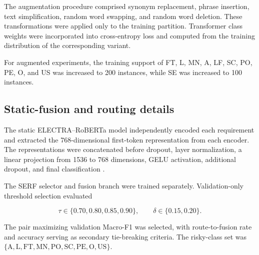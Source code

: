 \documentclass[runningheads]{llncs}
\begin{document}
The augmentation procedure comprised synonym replacement, phrase insertion, text simplification, random word swapping, and random word deletion. These transformations were applied only to the training partition. Transformer class weights were incorporated into cross-entropy loss and computed from the training distribution of the corresponding variant.

For augmented experiments, the training support of FT, L, MN, A, LF, SC, PO, PE, O, and US was increased to 200 instances, while SE was increased to 100 instances.

\subsection*{Static-fusion and routing details}

The static ELECTRA--RoBERTa model independently encoded each requirement and extracted the 768-dimensional first-token representation from each encoder. The representations were concatenated before dropout, layer normalization, a linear projection from 1536 to 768 dimensions, GELU activation, additional dropout, and final classification \cite{said_functional_nonfunctional}.

The SERF selector and fusion branch were trained separately. Validation-only threshold selection evaluated

\[ \tau\in\{0.70,0.80,0.85,0.90\},\qquad \delta\in\{0.15,0.20\}. \]

The pair maximizing validation Macro-F1 was selected, with route-to-fusion rate and accuracy serving as secondary tie-breaking criteria. The risky-class set was \(\{\mathrm{A,L,FT,MN,PO,SC,PE,O,US}\}\).
\end{document}
